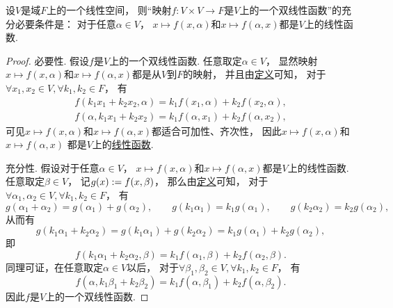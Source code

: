 \begin{theorem}\label{definition:双线性函数.双线性函数的定义2}
设\(V\)是域\(F\)上的一个线性空间，
则“映射\(f\colon V \times V \to F\)是\(V\)上的一个双线性函数”的充分必要条件是：
对于任意\(\alpha \in V\)，
\(x \mapsto f(x,\alpha)\)和\(x \mapsto f(\alpha,x)\)都是\(V\)上的线性函数.
\begin{proof}
必要性.
假设\(f\)是\(V\)上的一个双线性函数.
任意取定\(\alpha \in V\)，
显然映射\(x \mapsto f(x,\alpha)\)和\(x \mapsto f(\alpha,x)\)都是从\(V\)到\(F\)的映射，
并且由\hyperref[definition:双线性函数.双线性函数的定义1]{定义}可知，
对于\(\forall x_1,x_2 \in V,
\forall k_1,k_2 \in F\)，
有\begin{gather*}
	f(k_1x_1+k_2x_2,\alpha)
	= k_1 f(x_1,\alpha)
	+ k_2 f(x_2,\alpha), \\
	f(\alpha,k_1x_1+k_2x_2)
	= k_1 f(\alpha,x_1)
	+ k_2 f(\alpha,x_2),
\end{gather*}
可见\(x \mapsto f(x,\alpha)\)和\(x \mapsto f(\alpha,x)\)都适合可加性、齐次性，
因此\(x \mapsto f(x,\alpha)\)和\(x \mapsto f(\alpha,x)\)
都是\(V\)上的\hyperref[definition:线性映射.线性函数]{线性函数}.

充分性.
假设对于任意\(\alpha \in V\)，
\(x \mapsto f(x,\alpha)\)和\(x \mapsto f(\alpha,x)\)都是\(V\)上的线性函数.
任意取定\(\beta \in V\)，
记\(g(x) := f(x,\beta)\)，
那么由\hyperref[definition:线性映射.线性映射]{定义}可知，
对于\(\forall \alpha_1,\alpha_2 \in V,
\forall k_1,k_2 \in F\)，
有\begin{equation*}
	g(\alpha_1+\alpha_2)=g(\alpha_1)+g(\alpha_2),
	\qquad
	g(k_1\alpha_1)=k_1g(\alpha_1),
	\qquad
	g(k_2\alpha_2)=k_2g(\alpha_2),
\end{equation*}
从而有\begin{equation*}
	g(k_1\alpha_1+k_2\alpha_2)
	= g(k_1\alpha_1) + g(k_2\alpha_2)
	= k_1g(\alpha_1) + k_2g(\alpha_2),
\end{equation*}
即\begin{equation*}
	f(k_1\alpha_1+k_2\alpha_2,\beta)
	= k_1 f(\alpha_1,\beta)
	+ k_2 f(\alpha_2,\beta).
\end{equation*}
同理可证，在任意取定\(\alpha \in V\)以后，
对于\(\forall \beta_1,\beta_2 \in V,
\forall k_1,k_2 \in F\)，
有\begin{equation*}
	f(\alpha,k_1\beta_1+k_2\beta_2)
	= k_1 f(\alpha,\beta_1)
	+ k_2 f(\alpha,\beta_2).
\end{equation*}
因此\(f\)是\(V\)上的一个双线性函数.
\end{proof}
\end{theorem}

